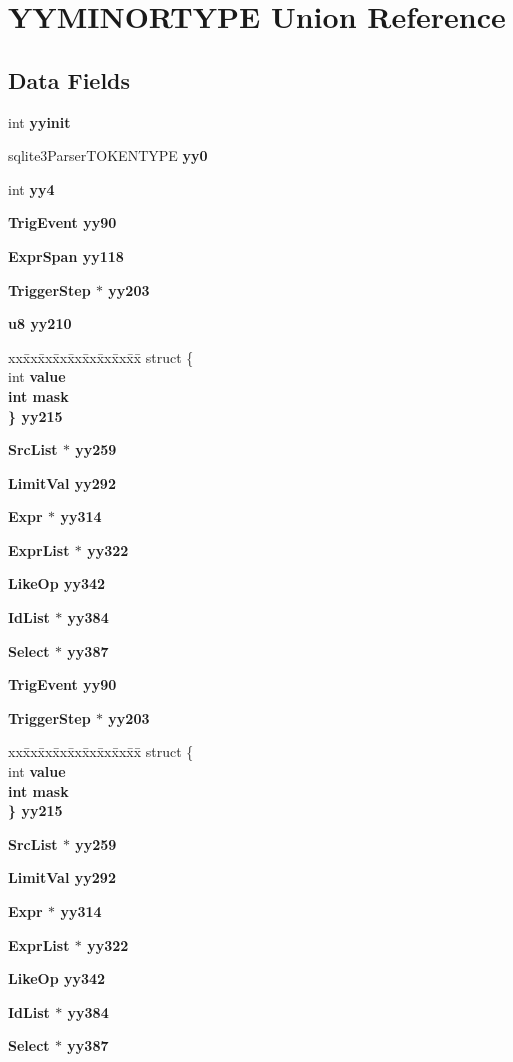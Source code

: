 \section{YYMINORTYPE Union Reference}
\label{unionYYMINORTYPE}
\subsection*{Data Fields}
\begin{CompactItemize}
\item 
int \bf{yyinit}
\item 
sqlite3Parser\-TOKENTYPE \bf{yy0}
\item 
int \bf{yy4}
\item 
\bf{Trig\-Event} \bf{yy90}
\item 
\bf{Expr\-Span} \bf{yy118}
\item 
\bf{Trigger\-Step} $\ast$ \bf{yy203}
\item 
\bf{u8} \bf{yy210}
\item 
\begin{tabbing}
xx\=xx\=xx\=xx\=xx\=xx\=xx\=xx\=xx\=\kill
struct \{\\
\>int \bf{value}\\
\>int \bf{mask}\\
\} \bf{yy215}\\

\end{tabbing}\item 
\bf{Src\-List} $\ast$ \bf{yy259}
\item 
\bf{Limit\-Val} \bf{yy292}
\item 
\bf{Expr} $\ast$ \bf{yy314}
\item 
\bf{Expr\-List} $\ast$ \bf{yy322}
\item 
\bf{Like\-Op} \bf{yy342}
\item 
\bf{Id\-List} $\ast$ \bf{yy384}
\item 
\bf{Select} $\ast$ \bf{yy387}
\item 
\bf{Trig\-Event} \bf{yy90}
\item 
\bf{Trigger\-Step} $\ast$ \bf{yy203}
\item 
\begin{tabbing}
xx\=xx\=xx\=xx\=xx\=xx\=xx\=xx\=xx\=\kill
struct \{\\
\>int \bf{value}\\
\>int \bf{mask}\\
\} \bf{yy215}\\

\end{tabbing}\item 
\bf{Src\-List} $\ast$ \bf{yy259}
\item 
\bf{Limit\-Val} \bf{yy292}
\item 
\bf{Expr} $\ast$ \bf{yy314}
\item 
\bf{Expr\-List} $\ast$ \bf{yy322}
\item 
\bf{Like\-Op} \bf{yy342}
\item 
\bf{Id\-List} $\ast$ \bf{yy384}
\item 
\bf{Select} $\ast$ \bf{yy387}
\end{CompactItemize}


